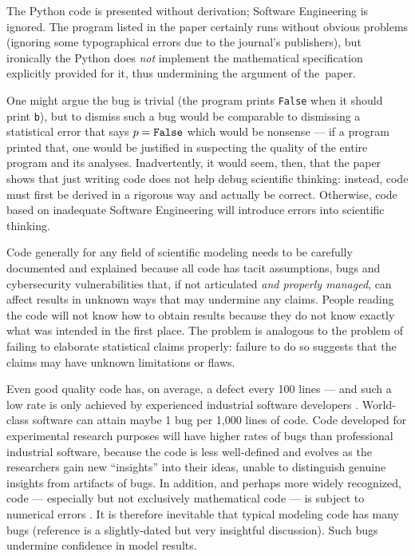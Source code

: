 \documentclass{comjnl}
\begin{document}
The Python code is presented without derivation; Software Engineering is ignored. The program listed in the paper certainly runs without obvious problems (ignoring some typographical errors due to the journal's publishers), but ironically the Python does \emph{not\/} implement the mathematical specification explicitly provided for it, thus undermining the argument of the~paper. 

One might argue the bug is trivial (the program prints \texttt{False} when it should print \texttt{b}), but to dismiss such a bug would be comparable to dismissing a statistical error that says $p=\mbox{\tt False}$ which would be nonsense --- if a program printed that, one would be justified in suspecting the quality of the entire program and its analyses. Inadvertently, it would seem, then, that the paper shows that just writing code does not help debug scientific thinking: instead, code must first be derived in a rigorous way and actually be correct. Otherwise, code based on inadequate Software Engineering will introduce errors into scientific thinking.

Code generally for any field of scientific modeling needs to be carefully documented and explained because all code has tacit assumptions, bugs and cybersecurity vulnerabilities \cite{Ben,nature-review,se-bias} that, if not articulated \emph{and properly managed}, can affect results in unknown ways that may undermine any claims. People reading the code will not know how to obtain results because they do not know exactly what was intended in the first place. The problem is analogous to the problem of failing to elaborate statistical claims properly: failure to do so suggests that the claims may have unknown limitations or flaws.

Even good quality code has, on average, a defect every 100 lines --- and {such a low} rate is only achieved by experienced industrial software developers \cite{ourReview}. World-class software can attain maybe 1 bug per 1,000 lines of code. Code developed for experimental research purposes will have higher rates of bugs than professional industrial software, because the code is less well-defined and evolves as the researchers gain new ``insights'' into their ideas, unable to distinguish genuine insights from artifacts of bugs. In addition, and perhaps more widely recognized, code --- especially but not exclusively mathematical code --- is subject to numerical errors \cite{hamming}. It is therefore inevitable that typical modeling code has many bugs (reference \cite{NVP} is a slightly-dated but very insightful discussion). Such bugs undermine confidence in model results. 
\end{document}
